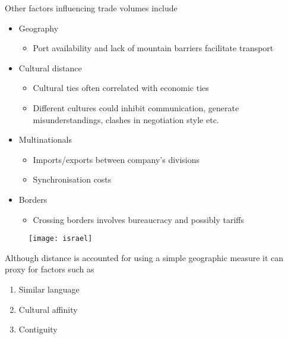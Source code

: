 \documentclass{beamer}
\begin{document}
\begin{frame}
  Other factors influencing trade volumes include
  \begin{itemize}
    \item Geography
    \begin{itemize}
      \item Port availability and lack of mountain barriers facilitate transport
    \end{itemize}
    \medskip
    \item Cultural distance
    \begin{itemize}
      \item Cultural ties often correlated with economic ties
      \item Different cultures could inhibit communication, generate misunderstandings, clashes in negotiation style etc.
    \end{itemize}
    \medskip
    \item Multinationals
    \begin{itemize}
      \item Imports/exports between company's divisions
      \item Synchronisation costs
    \end{itemize}
    \medskip
    \item Borders
    \begin{itemize}
      \item Crossing borders involves bureaucracy and possibly tariffs
    \end{itemize}    
  \end{itemize}  
\end{frame}

\begin{frame}
  \begin{figure}\centering
    \texttt{[image: israel]}
  \end{figure}
\end{frame}

\begin{frame}
  Although distance is accounted for using a simple geographic measure it can proxy for factors such as
  \begin{enumerate}
    \item Similar language
    \item Cultural affinity
    \item Contiguity
  \end{enumerate}
\end{frame}
\end{document}
